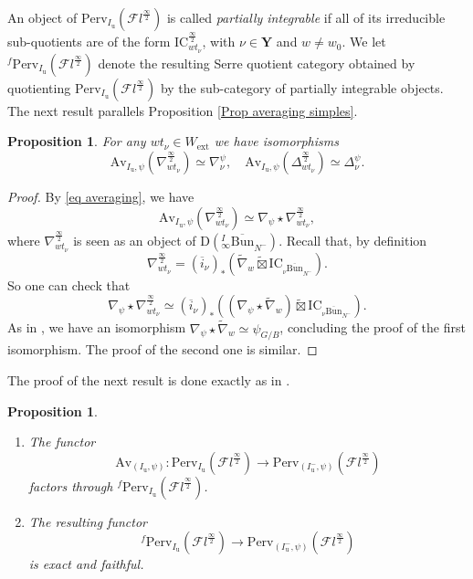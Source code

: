\documentclass[11pt]{amsart}
\theoremstyle{plain}
\newtheorem{prop}[thm]{Proposition}
\theoremstyle{remark}
\numberwithin{equation}{section}
\begin{document}
	
	An object of $\mathrm{Perv}_{I_\mathrm{u}}(\mathcal{F}l^{\frac{\infty}{2}})$ is called \textit{partially integrable} if all of its irreducible sub-quotients are of the form $\mathrm{IC}^{\frac{\infty}{2}}_{wt_\nu}$, with $\nu\in\mathbf{Y}$ and $w\neq w_0$. We let $^f\mathrm{Perv}_{I_\mathrm{u}}(\mathcal{F}l^{\frac{\infty}{2}})$ denote the resulting Serre quotient category obtained by quotienting $\mathrm{Perv}_{I_\mathrm{u}}(\mathcal{F}l^{\frac{\infty}{2}})$ by the sub-category of partially integrable objects. The next result parallels Proposition \ref{Prop averaging simples}.
 \begin{prop}\label{prop averaging simples 2}
      For any $wt_\nu\in W_\mathrm{ext}$ we have isomorphisms
   $$\mathrm{Av}_{I_\mathrm{u},\psi}(\nabla^{\frac{\infty}{2}}_{wt_\nu})\simeq\nabla^{\psi}_{\nu},\quad \mathrm{Av}_{I_\mathrm{u},\psi}(\Delta^{\frac{\infty}{2}}_{wt_\nu})\simeq\Delta^{\psi}_{\nu}.$$
 \end{prop}
 \begin{proof}
 By \eqref{eq averaging}, we have 
 $$\mathrm{Av}_{I_\mathrm{u},\psi}(\nabla^{\frac{\infty}{2}}_{wt_\nu})\simeq \nabla_\psi\star \nabla^{\frac{\infty}{2}}_{wt_\nu},$$
 where $\nabla^{\frac{\infty}{2}}_{wt_\nu}$ is seen as an object of $\mathrm{D}({_{ \infty}^{I}\overline{\mathrm{Bun}}}_{N^-})$. Recall that, by definition 
 $$\nabla^{\frac{\infty}{2}}_{wt_\nu}=(\overline{i}_\nu)_{*}\left(\tilde{\nabla}_w\widetilde{\boxtimes}\mathrm{IC}_{{_\nu\overline{\mathrm{Bun}}}_{N^-}}\right).$$
 So one can check that 
 $$\nabla_\psi\star \nabla^{\frac{\infty}{2}}_{wt_\nu}\simeq (\overline{i}_\nu)_{*}\left((\nabla_\psi\star\tilde{\nabla}_w)\widetilde{\boxtimes}\mathrm{IC}_{{_\nu\overline{\mathrm{Bun}}}_{N^-}}\right). $$
 As in \cite[Lemma 4.4.8]{MR3003920}, we have an isomorphism  $\nabla_\psi\star\tilde{\nabla}_w\simeq \psi_{G/B}$, concluding the proof of the first isomorphism. The proof of the second one is similar.
 \end{proof}
 The proof of the next result is done exactly as in \cite[Proposition 4.4.13]{ABBGM}.
	\begin{prop}\label{prop functor average}
		\begin{enumerate}
			\item The functor 
			$$\mathrm{Av}_{(I_\mathrm{u},\psi)}:\mathrm{Perv}_{I_\mathrm{u}}(\mathcal{F}l^{\frac{\infty}{2}})\to  \mathrm{Perv}_{(I^-_\mathrm{u},\psi)}(\mathcal{F}l^{\frac{\infty}{2}})  $$
			factors through $^f\mathrm{Perv}_{I_\mathrm{u}}(\mathcal{F}l^{\frac{\infty}{2}})$.
			\item The resulting functor 
			$$^f\mathrm{Perv}_{I_\mathrm{u}}(\mathcal{F}l^{\frac{\infty}{2}})\to  \mathrm{Perv}_{(I^-_\mathrm{u},\psi)}(\mathcal{F}l^{\frac{\infty}{2}}) $$
			is exact and faithful.
		\end{enumerate}
	\end{prop}
\end{document}
